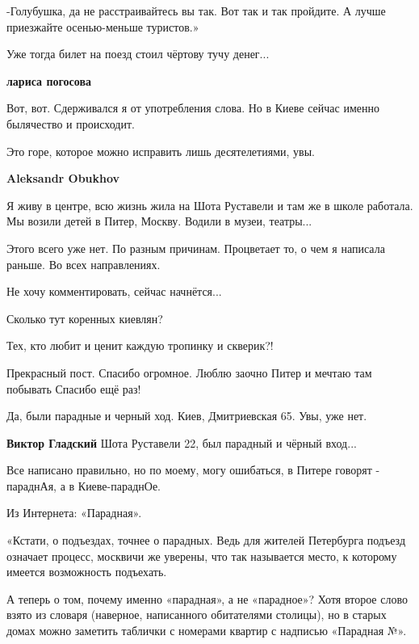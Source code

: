\begin{itemize}
\begin{itemize}
\begin{itemize}
-Голубушка, да не расстраивайтесь вы так. Вот так и так пройдите. А лучше
приезжайте осенью-меньше туристов.»

Уже тогда билет на поезд стоил чёртову тучу денег...

\textbf{лариса погосова}

Вот, вот. Сдерживался я от употребления слова. Но в Киеве сейчас именно
былячество и происходит.

Это горе, которое можно исправить лишь десятелетиями, увы.

\textbf{Aleksandr Obukhov}

Я живу в центре, всю жизнь жила на Шота Руставели и там же в школе работала. Мы
возили детей в Питер, Москву. Водили в музеи, театры...

Этого всего уже нет. По разным причинам. Процветает то, о чем я написала раньше. Во
всех направлениях.

Не хочу комментировать, сейчас начнётся...

Сколько тут коренных киевлян?

Тех, кто любит и ценит каждую тропинку и скверик?!

\end{itemize} %

\end{itemize} %


Прекрасный пост. Спасибо огромное. Люблю заочно Питер и мечтаю там побывать
Спасибо ещё раз!

Да, были парадные и черный ход. Киев, Дмитриевская 65. Увы, уже нет.

\textbf{Виктор Гладский}
Шота Руставели 22, был парадный и чёрный вход...

Все написано правильно, но по моему, могу ошибаться, в Питере говорят - параднАя, а в Киеве-параднОе.

\begin{itemize} %
Из Интернета: «Парадная».

«Кстати, о подъездах, точнее о парадных. Ведь для жителей Петербурга подъезд
означает процесс, москвичи же уверены, что так называется место, к которому
имеется возможность подъехать.

А теперь о том, почему именно «парадная», а не «парадное»? Хотя второе слово
взято из словаря (наверное, написанного обитателями столицы), но в старых домах
можно заметить таблички с номерами квартир с надписью «Парадная №».


\end{itemize}
\end{itemize}
